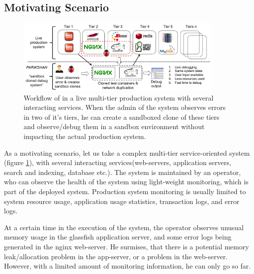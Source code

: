 \subsection{Motivating Scenario}
\label{sec:motivation}

\begin{figure}[ht]
  \begin{center}
    \includegraphics[width=0.9\textwidth]{figs/workflow3.png}
    \caption{Workflow of \parikshan in a live multi-tier production system with several interacting services. When the admin of the system observes errors in two of it's tiers, he can create a sandboxed clone of these tiers and observe/debug them in a sandbox environment without impacting the actual production system.}
    \label{fig:motivation}
  \end{center}
\end{figure}

\noindent
As a motivating scenario, let us take a complex multi-tier service-oriented system (figure \ref{fig:motivation}), with several interacting services(web-servers, application servers, search and indexing, database etc.). 
The system is maintained by an operator, who can observe the health of the system using light-weight monitoring, which is part of the deployed system.
Production system monitoring is usually limited to system resource usage, application usage statistics, transaction logs, and error logs.

At a certain time in the execution of the system, the operator observes unusual memory usage in the glassfish application server, and some error logs being generated in the nginx web-server. 
He surmises, that there is a potential memory leak/allocation problem in the app-server, or a problem in the web-server.
However, with a limited amount of monitoring information, he can only go so far.

